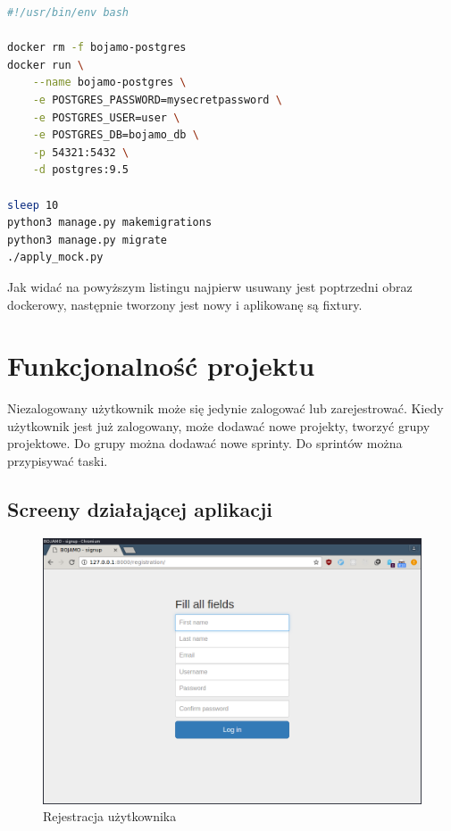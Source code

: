 \documentclass[12pt]{article}
\begin{document}
\begin{lstlisting}[caption={scripts/reset\_db.sh},language=bash]
#!/usr/bin/env bash

docker rm -f bojamo-postgres
docker run \
    --name bojamo-postgres \
    -e POSTGRES_PASSWORD=mysecretpassword \
    -e POSTGRES_USER=user \
    -e POSTGRES_DB=bojamo_db \
    -p 54321:5432 \
    -d postgres:9.5

sleep 10
python3 manage.py makemigrations
python3 manage.py migrate
./apply_mock.py
\end{lstlisting}

Jak widać na powyższym listingu najpierw usuwany jest poptrzedni obraz dockerowy, następnie tworzony jest nowy i aplikowanę są fixtury.


\section{Funkcjonalność projektu}
Niezalogowany użytkownik może się jedynie zalogować lub zarejestrować. Kiedy użytkownik jest już zalogowany, może dodawać nowe projekty, tworzyć grupy projektowe. Do grupy można dodawać nowe sprinty. Do sprintów można przypisywać taski.

\subsection{Screeny działającej aplikacji}

\begin{figure}[htp]
\centering
\includegraphics[scale=.5]{img/register.png}
\caption{Rejestracja użytkownika}
\label{}
\end{figure}
\end{document}
